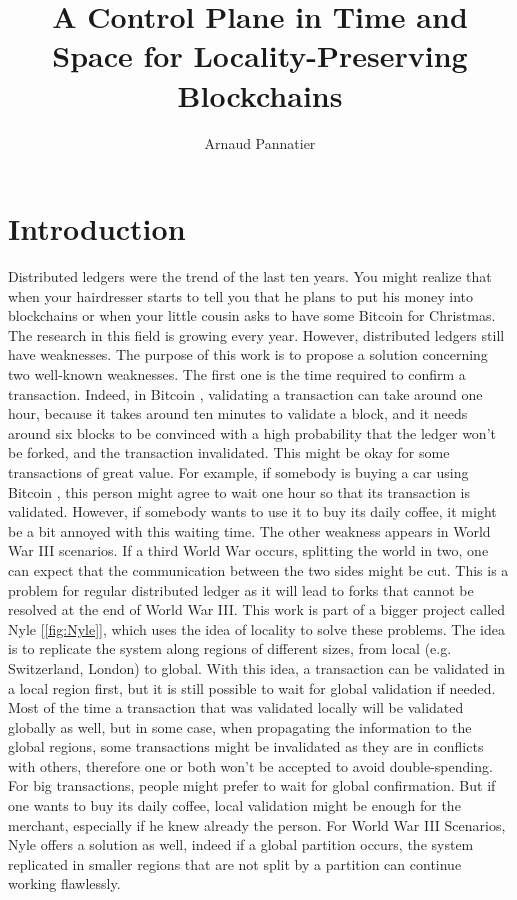 \documentclass[a4paper,11pt,oneside]{report}
\title{A Control Plane in Time and Space for Locality-Preserving Blockchains}
\author{Arnaud Pannatier}
\begin{document}
\maketitle 

\maketoc

\chapter{Introduction} %

Distributed ledgers were the trend of the last ten years. You might realize
that when your hairdresser starts to tell you that he plans to put his money
into blockchains or when your little cousin asks to have some Bitcoin
\cite{Nakamoto2009} for Christmas. The research in this field is growing every
year. However, distributed ledgers still have weaknesses. The purpose of this
work is to propose a solution concerning two well-known weaknesses. The first
one is the time required to confirm a transaction.  Indeed, in Bitcoin
\cite{Nakamoto2009}, validating a transaction can take around one hour, because
it takes around ten minutes to validate a block, and it needs around six blocks
to be convinced with a high probability that the ledger won't be forked, and
the transaction invalidated. This might be okay for some transactions of great
value. For example, if somebody is buying a car using Bitcoin
\cite{Nakamoto2009}, this person might agree to wait one hour so that its
transaction is validated. However, if somebody wants to use it to buy its daily
coffee, it might be a bit annoyed with this waiting time. The other weakness
appears in World War III scenarios. If a third World War occurs, splitting the
world in two, one can expect that the communication between the two sides might
be cut. This is a problem for regular distributed ledger as it will lead to
forks that cannot be resolved at the end of World War III. This work is part of
a bigger project called Nyle [\autoref{fig:Nyle}], which uses the idea of
locality to solve these problems.  The idea is to replicate the system along
regions of different sizes, from local (e.g. Switzerland, London) to global.
With this idea, a transaction can be validated in a local region first, but it
is still possible to wait for global validation if needed. Most of the time a
transaction that was validated locally will be validated globally as well, but
in some case, when propagating the information to the global regions, some
transactions might be invalidated as they are in conflicts with others,
therefore one or both won't be accepted to avoid double-spending. For big
transactions, people might prefer to wait for global confirmation. But if one
wants to buy its daily coffee, local validation might be enough for the
merchant, especially if he knew already the person. For World War III
Scenarios, Nyle offers a solution as well, indeed if a global partition occurs,
the system replicated in smaller regions that are not split
by a partition can continue working flawlessly. 
\end{document}
